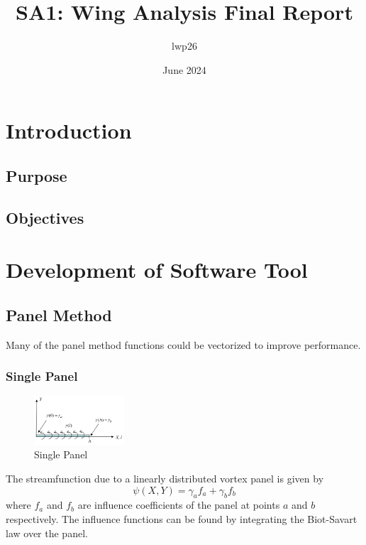 \documentclass{article}
\begin{document}
\title{SA1: Wing Analysis Final Report}
\author{lwp26}
\date{June 2024}
\maketitle 

\section{Introduction}
\subsection{Purpose}

\subsection{Objectives}

\section{Development of Software Tool}

\subsection{Panel Method}

Many of the panel method functions could be vectorized to improve performance.
\subsubsection{Single Panel}

\begin{figure}[H]
    \centering
    \includegraphics[width=0.3\textwidth]{figures/single_panel.jpg}
    \caption{Single Panel}
    \label{fig:single_panel}
\end{figure}
The streamfunction due to a linearly distributed vortex panel is given by
\begin{equation}
    \psi(X,Y) = \gamma_a f_a + \gamma_b f_b
\end{equation}
where $f_a$ and $f_b$ are influence coefficients of the panel at points $a$ and $b$ respectively.
The influence functions can be found by integrating the Biot-Savart law over the panel.
\end{document}
